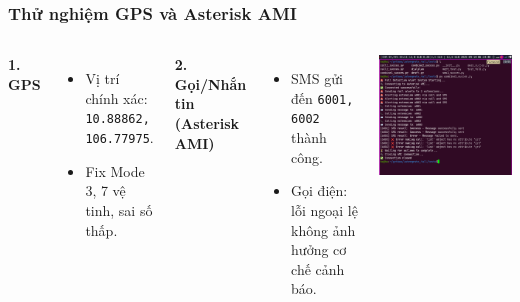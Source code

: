 \begin{frame}[t]
\frametitle{Thử nghiệm GPS và Asterisk AMI}
\begin{columns}[T]
    \textbf{1. GPS}
    \begin{itemize}
        \item Vị trí chính xác: \texttt{10.88862, 106.77975}.
        \item Fix Mode 3, 7 vệ tinh, sai số thấp.
    \end{itemize}
    \textbf{2. Gọi/Nhắn tin (Asterisk AMI)}
    \begin{itemize}
        \item SMS gửi đến \texttt{6001, 6002} thành công.
        \item Gọi điện: lỗi ngoại lệ không ảnh hưởng cơ chế cảnh báo.
    \end{itemize}

    \centering
    \includegraphics[width=\linewidth]{images/ast_call_sms_test.png}
\end{columns}
\end{frame}

